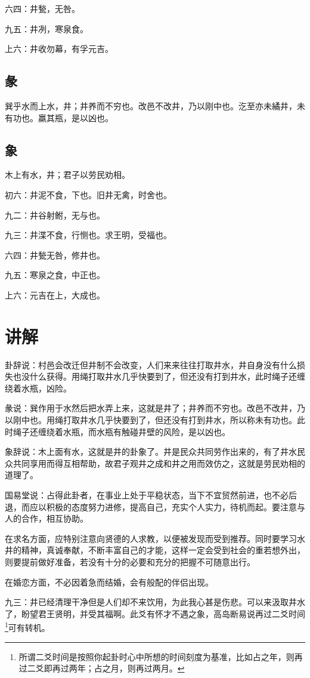 \documentclass[12pt,oneside]{book}
\begin{document}
六四：井甃，无咎。

九五：井冽，寒泉食。

上六：井收勿幕，有孚元吉。

\subsection{彖}
巽乎水而上水，井；井养而不穷也。改邑不改井，乃以刚中也。汔至亦未繘井，未有功也。羸其瓶，是以凶也。

\subsection{象}
木上有水，井；君子以劳民劝相。

初六：井泥不食，下也。旧井无禽，时舍也。

九二：井谷射鲋，无与也。

九三：井渫不食，行恻也。求王明，受福也。

六四：井甃无咎，修井也。

九五：寒泉之食，中正也。

上六：元吉在上，大成也。

\section{讲解}
卦辞说：村邑会改迁但井制不会改变，人们来来往往打取井水，井自身没有什么损失也没什么获得。用绳打取井水几乎快要到了，但还没有打到井水，此时绳子还缠绕着水瓶，凶险。

彖说：巽作用于水然后把水弄上来，这就是井了；井养而不穷也。改邑不改井，乃以刚中也。用绳打取井水几乎快要到了，但还没有打到井水，所以称未有功也。此时绳子还缠绕着水瓶，而水瓶有触碰井壁的风险，是以凶也。

象辞说：木上面有水，这就是井的卦象了。井是民众共同劳作出来的，有了井水民众共同享用而得互相帮助，故君子观井之成和井之用而效仿之，这就是劳民劝相的道理了。

国易堂说：占得此卦者，在事业上处于平稳状态，当下不宜贸然前进，也不必后退，而应以积极的态度努力进修，提高自己，充实个人实力，待机而起。要注意与人的合作，相互协助。

在求名方面，应特别注意向贤德的人求教，以便被发现而受到推荐。同时要学习水井的精神，真诚奉献，不断丰富自己的才能，这样一定会受到社会的重若想外出，则要提前做好准备，若没有十分的必要和充分的把握不可随意出行。

在婚恋方面，不必因着急而结婚，会有般配的伴侣出现。

九三：井已经清理干净但是人们却不来饮用，为此我心甚是伤悲。可以来汲取井水了，盼望君王贤明，并受其福啊。此爻有怀才不遇之象，高岛断易说再过二爻时间\footnote{所谓二爻时间是按照你起卦时心中所想的时间刻度为基准，比如占之年，则再过二爻即再过两年；占之月，则再过两月。}可有转机。
\end{document}
